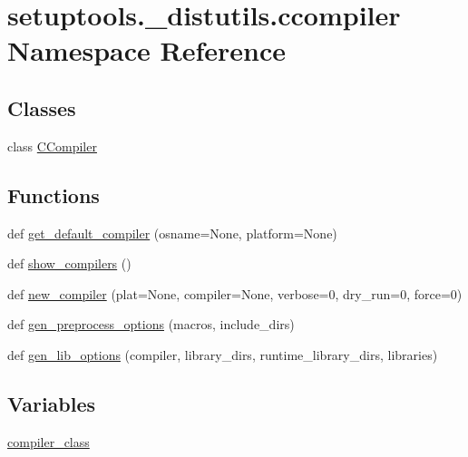 \hypertarget{namespacesetuptools_1_1__distutils_1_1ccompiler}{}\section{setuptools.\+\_\+distutils.\+ccompiler Namespace Reference}
\label{namespacesetuptools_1_1__distutils_1_1ccompiler}
\subsection*{Classes}
\begin{DoxyCompactItemize}
\item 
class \hyperlink{classsetuptools_1_1__distutils_1_1ccompiler_1_1CCompiler}{C\+Compiler}
\end{DoxyCompactItemize}
\subsection*{Functions}
\begin{DoxyCompactItemize}
\item 
def \hyperlink{namespacesetuptools_1_1__distutils_1_1ccompiler_afbcbb6febf94a459bb5f8329bd2dcb9b}{get\+\_\+default\+\_\+compiler} (osname=None, platform=None)
\item 
def \hyperlink{namespacesetuptools_1_1__distutils_1_1ccompiler_a764b086d07417c6b316bc8d81f9bf897}{show\+\_\+compilers} ()
\item 
def \hyperlink{namespacesetuptools_1_1__distutils_1_1ccompiler_aa33975550d1aae55411abeb711b8f7fb}{new\+\_\+compiler} (plat=None, compiler=None, verbose=0, dry\+\_\+run=0, force=0)
\item 
def \hyperlink{namespacesetuptools_1_1__distutils_1_1ccompiler_a61e9065d3f34f4c2f88deb2eda16d537}{gen\+\_\+preprocess\+\_\+options} (macros, include\+\_\+dirs)
\item 
def \hyperlink{namespacesetuptools_1_1__distutils_1_1ccompiler_a3c8fe797e125f47bef62aae7ab76aad7}{gen\+\_\+lib\+\_\+options} (compiler, library\+\_\+dirs, runtime\+\_\+library\+\_\+dirs, libraries)
\end{DoxyCompactItemize}
\subsection*{Variables}
\begin{DoxyCompactItemize}
\item 
\hyperlink{namespacesetuptools_1_1__distutils_1_1ccompiler_ad41ffa303595565cef666a42c0e954da}{compiler\+\_\+class}
\end{DoxyCompactItemize}


